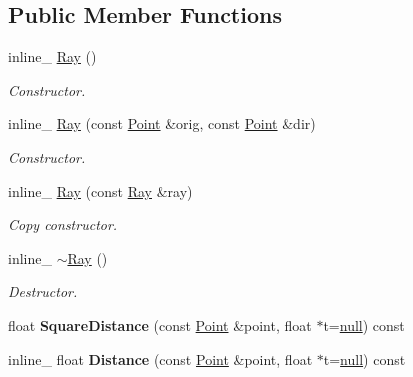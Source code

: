 \subsection*{Public Member Functions}
\begin{DoxyCompactItemize}
\item 
inline\+\_\+ \hyperlink{classOpcode_1_1Ray_ae4a9e3d42ba616722f98667f6c415695}{Ray} ()\hypertarget{classOpcode_1_1Ray_ae4a9e3d42ba616722f98667f6c415695}{}\label{classOpcode_1_1Ray_ae4a9e3d42ba616722f98667f6c415695}

\begin{DoxyCompactList}\small\item\em Constructor. \end{DoxyCompactList}\item 
inline\+\_\+ \hyperlink{classOpcode_1_1Ray_a753385449e77f6dd496de5cc4141de61}{Ray} (const \hyperlink{classOpcode_1_1Point}{Point} \&orig, const \hyperlink{classOpcode_1_1Point}{Point} \&dir)\hypertarget{classOpcode_1_1Ray_a753385449e77f6dd496de5cc4141de61}{}\label{classOpcode_1_1Ray_a753385449e77f6dd496de5cc4141de61}

\begin{DoxyCompactList}\small\item\em Constructor. \end{DoxyCompactList}\item 
inline\+\_\+ \hyperlink{classOpcode_1_1Ray_a4c13f6f251acc660a240680c87dcae8f}{Ray} (const \hyperlink{classOpcode_1_1Ray}{Ray} \&ray)\hypertarget{classOpcode_1_1Ray_a4c13f6f251acc660a240680c87dcae8f}{}\label{classOpcode_1_1Ray_a4c13f6f251acc660a240680c87dcae8f}

\begin{DoxyCompactList}\small\item\em Copy constructor. \end{DoxyCompactList}\item 
inline\+\_\+ \hyperlink{classOpcode_1_1Ray_a1a7d099f2f58221b194a2cb7940eb320}{$\sim$\+Ray} ()\hypertarget{classOpcode_1_1Ray_a1a7d099f2f58221b194a2cb7940eb320}{}\label{classOpcode_1_1Ray_a1a7d099f2f58221b194a2cb7940eb320}

\begin{DoxyCompactList}\small\item\em Destructor. \end{DoxyCompactList}\item 
float {\bfseries Square\+Distance} (const \hyperlink{classOpcode_1_1Point}{Point} \&point, float $\ast$t=\hyperlink{IceTypes_8h_ac97b8ee753e4405397a42ad5799b0f9e}{null}) const \hypertarget{classOpcode_1_1Ray_af768696653b687f4ec0d23f5973fba39}{}\label{classOpcode_1_1Ray_af768696653b687f4ec0d23f5973fba39}

\item 
inline\+\_\+ float {\bfseries Distance} (const \hyperlink{classOpcode_1_1Point}{Point} \&point, float $\ast$t=\hyperlink{IceTypes_8h_ac97b8ee753e4405397a42ad5799b0f9e}{null}) const \hypertarget{classOpcode_1_1Ray_a53b4772b6b80c933456fb99fb347cd7d}{}\label{classOpcode_1_1Ray_a53b4772b6b80c933456fb99fb347cd7d}

\end{DoxyCompactItemize}
